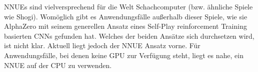 \acp{NNUE} sind vielversprechend für die Welt Schachcomputer (bzw. ähnliche Spiele wie Shogi). Womöglich gibt es Anwendungsfälle außerhalb dieser Spiele, wie sie AlphaZero mit seinem generellen Ansatz eines Self-Play reinforcement Training basierten \acp{CNN} gefunden hat. Welches der beiden Ansätze sich durchsetzen wird, ist nicht klar. Aktuell liegt jedoch der \ac{NNUE} Ansatz vorne. Für Anwendungsfälle, bei denen keine GPU zur Verfügung steht, liegt es nahe, ein \ac{NNUE} auf der CPU zu verwenden.